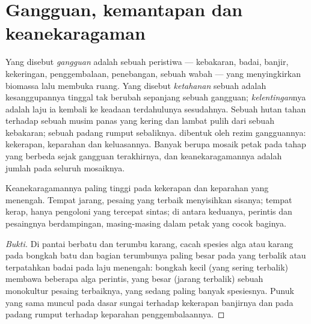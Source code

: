 \section{Gangguan, kemantapan dan keanekaragaman}

\begin{definition}\label{def:b1:ecosystem-dynamics:disturbance}
Yang disebut \emph{gangguan} adalah sebuah peristiwa --- kebakaran,
badai, banjir, kekeringan, penggembalaan, penebangan, sebuah wabah ---
yang menyingkirkan biomassa lalu membuka ruang. Yang disebut
\emph{ketahanan} sebuah  adalah kesanggupannya tinggal tak
berubah sepanjang sebuah gangguan; \emph{kelentingan}nya adalah laju
ia kembali ke keadaan terdahulunya sesudahnya. Sebuah hutan tahan
terhadap sebuah musim panas yang kering dan lambat pulih dari sebuah
kebakaran; sebuah padang rumput sebaliknya.  dibentuk oleh
rezim gangguannya: kekerapan, keparahan dan keluasannya. Banyak
 berupa mosaik petak pada tahap  yang berbeda sejak
gangguan terakhirnya, dan keanekaragamannya adalah jumlah pada seluruh
mosaiknya.
\end{definition}

\begin{proposition}\label{prop:b1:ecosystem-dynamics:idh}
Keanekaragamannya paling tinggi pada kekerapan dan keparahan 
yang menengah. Tempat  jarang, pesaing yang terbaik
menyisihkan sisanya; tempat  kerap, hanya pengoloni yang
tercepat sintas; di antara keduanya, perintis dan pesaingnya
berdampingan, masing-masing dalam petak yang cocok baginya.
\end{proposition}
\begin{proof}[Bukti]
Di pantai berbatu dan terumbu karang, cacah spesies alga atau karang
pada bongkah batu dan bagian terumbunya paling besar pada yang
terbalik atau terpatahkan badai pada laju menengah: bongkah kecil
(yang sering terbalik) membawa beberapa alga perintis, yang besar
(jarang terbalik) sebuah monokultur pesaing terbaiknya, yang sedang
paling banyak spesiesnya. Punuk yang sama muncul pada dasar sungai
terhadap kekerapan banjirnya dan pada padang rumput terhadap keparahan
penggembalaannya.
\end{proof}

